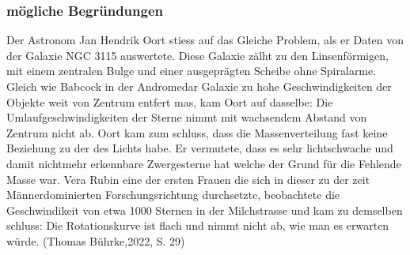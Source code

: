 \subsubsection{mögliche Begründungen}
Der Astronom Jan Hendrik Oort stiess auf das Gleiche Problem, als er Daten von der Galaxie NGC 3115 auswertete. Diese Galaxie zälht zu den Linsenförmigen, mit einem zentralen Bulge und einer ausgeprägten Scheibe ohne Spiralarme. 
Gleich wie Babcock in der Andromedar Galaxie zu hohe Geschwindigkeiten der Objekte weit von Zentrum entfert mas, kam Oort auf dasselbe: Die Umlaufgeschwindigkeiten der Sterne nimmt mit wachsendem Abstand von Zentrum nicht ab.
Oort kam zum schluss, dass die Massenverteilung fast keine Beziehung zu der des Lichts habe. Er vermutete, dass es sehr lichtschwache und damit nichtmehr erkennbare Zwergesterne hat welche der Grund für die Fehlende Masse war.
Vera Rubin eine der ersten Frauen die sich in dieser zu der zeit Männerdominierten Forschungsrichtung durchsetzte, beobachtete die Geschwindikeit von etwa 1000 Sternen in der Milchstrasse und kam zu demselben schluss: Die Rotationskurve 
ist flach und nimmt nicht ab, wie man es erwarten würde.  (Thomas Bührke,2022, S. 29)





